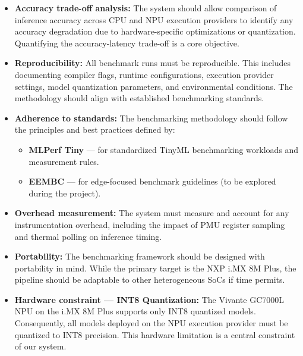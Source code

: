 \begin{itemize}
    \item \textbf{Accuracy trade-off analysis:} The system should allow comparison of inference accuracy across CPU and NPU execution providers to identify any accuracy degradation due to hardware-specific optimizations or quantization. Quantifying the accuracy-latency trade-off is a core objective.
    
    \item \textbf{Reproducibility:} All benchmark runs must be reproducible. This includes documenting compiler flags, runtime configurations, execution provider settings, model quantization parameters, and environmental conditions. The methodology should align with established benchmarking standards.
    
    \item \textbf{Adherence to standards:} The benchmarking methodology should follow the principles and best practices defined by:
    \begin{itemize}
        \item \textbf{MLPerf Tiny} \cite{ref:mlperf-tiny} — for standardized TinyML benchmarking workloads and measurement rules.
        \item \textbf{EEMBC} \cite{ref:eembc} — for edge-focused benchmark guidelines (to be explored during the project).
    \end{itemize}
    
    \item \textbf{Overhead measurement:} The system must measure and account for any instrumentation overhead, including the impact of PMU register sampling and thermal polling on inference timing.
    
    \item \textbf{Portability:} The benchmarking framework should be designed with portability in mind. While the primary target is the NXP i.MX 8M Plus, the pipeline should be adaptable to other heterogeneous SoCs if time permits.
    
    \item \textbf{Hardware constraint — INT8 Quantization:} The Vivante GC7000L NPU on the i.MX 8M Plus supports only INT8 quantized models. Consequently, all models deployed on the NPU execution provider must be quantized to INT8 precision. This hardware limitation is a central constraint of our system.
\end{itemize}

